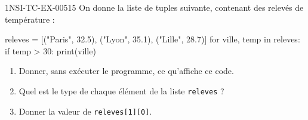 \begin{exercice}{1NSI-TC-EX-005}{1}{5}
On donne la liste de tuples suivante, contenant des relevés de température :
\begin{python}
releves = [("Paris", 32.5), ("Lyon", 35.1), ("Lille", 28.7)]
for ville, temp in releves:
    if temp > 30:
        print(ville)
\end{python}
\begin{enumerate}
  \item Donner, sans exécuter le programme, ce qu'affiche ce code.
  \item Quel est le type de chaque élément de la liste \lstinline{releves} ?
  \item Donner la valeur de \lstinline{releves[1][0]}.
\end{enumerate}
\end{exercice}
